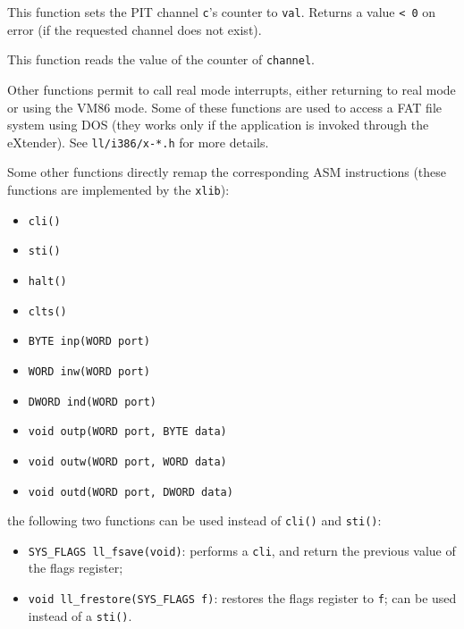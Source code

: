 \documentclass[a4paper]{report}
\begin{document}

This function sets the PIT channel {\tt c}'s counter to {\tt val}.
Returns a value {\tt < 0} on error (if the requested channel does not
exist).


This function reads the value of the counter of {\tt channel}.

Other functions permit to call real mode interrupts, either returning to
real mode or using the VM86 mode. Some of these functions are used to
access a FAT file system using DOS (they works only if the application is
invoked through the eXtender). See {\tt ll/i386/x-*.h} for more details.




Some other functions directly remap the corresponding ASM
instructions (these functions are implemented by the {\tt xlib}):
\begin{itemize}
\item {\tt cli()}
\item {\tt sti()}
\item {\tt halt()}
\item {\tt clts()}
\item {\tt BYTE inp(WORD port)}
\item {\tt WORD inw(WORD port)}
\item {\tt DWORD ind(WORD port)}
\item {\tt void outp(WORD port, BYTE data)}
\item {\tt void outw(WORD port, WORD data)}
\item {\tt void outd(WORD port, DWORD data)}
\end{itemize}
the following two functions can be used instead of {\tt cli()} and
{\tt sti()}:
\begin{itemize}
\item {\tt SYS\_FLAGS ll\_fsave(void)}: performs a {\tt cli}, and return the
		previous value of the flags register;
\item {\tt void ll\_frestore(SYS\_FLAGS f)}: restores the flags register to
		{\tt f}; can be used instead of a {\tt sti()}.
\end{itemize}
\end{document}
